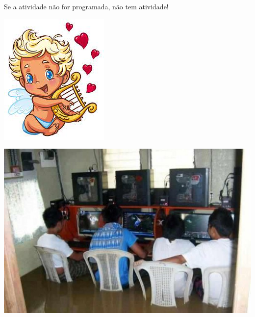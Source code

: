 			
	\vfill
	\pagebreak
		
		\vspace*{30mm}
	\begin{center}
			{\Huge \color{blue} Se a atividade não for programada, não tem atividade!}
	\end{center}
		
		\vfill\null
		\pagebreak
		
		\begin{center}
			\includegraphics[height=.7\textheight]{./IMG-GIT/anjo.jpg}
			
			
		\end{center}
		\vfill
		\pagebreak
		
		\begin{center}
			\includegraphics[height=.9\textheight]{./IMG-GIT/enchente.jpg}
		\end{center}
		
		\vfill
		\pagebreak
		
